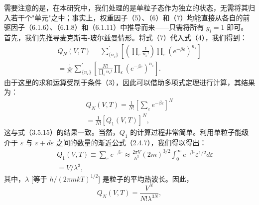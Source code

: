 需要注意的是，在本研究中，我们处理的是单粒子态作为独立的状态，无需将其归入若干个"单元"之中；事实上，权重因子（5）、（6）和（7）均能直接从各自的前驱因子（6.1.6）、（6.1.8）和（6.1.11）中推导而来——只需将所有 \(g_i = 1\) 即可。
首先，我们先推导麦克斯韦-玻尔兹曼情形。将式（7）代入式（4），我们得到：
\begin{equation}\tag{6.2.8}\label{eq:6.2.8}
\begin{array}{r} { Q _ { N } ( V , T ) = \sum _ { \{ n _ { \varepsilon } \} } ^{\prime} \left[ \left( \prod _ { \varepsilon } \frac { 1 } { n _ { \varepsilon } ! } \right) \prod _ { \varepsilon } \left( e ^{- \beta \varepsilon} \right) ^{n _ { \varepsilon} } \right] } \\{ = \frac { 1 } { N ! } \sum _ { \{ n _ { \varepsilon } \} } ^{\prime} \left[ \frac { N ! } { \prod _ { \varepsilon } n _ { \varepsilon } ! } \prod _ { \varepsilon } \left( e ^{- \beta \varepsilon} \right) ^{n _ { \varepsilon} } \right] . } \end{array}
\end{equation}
由于这里的求和运算受制于条件（3），因此可以借助多项式定理进行计算，其结果为：
\begin{equation}\tag{6.2.9}\label{eq:6.2.9}
\begin{array}{r} { Q _ { N } ( V , T ) = \frac { 1 } { N ! } \left[ \sum _ { \varepsilon } e ^{- \beta \varepsilon} \right] ^{N} } \\{ = \frac { 1 } { N ! } [ Q _ { 1 } ( V , T ) ] ^{N} , } \end{array}
\end{equation}
这与式（3.5.15）的结果一致。当然，\(Q_{1}\) 的计算过程非常简单。利用单粒子能级介于 \(\varepsilon\) 与 \(\varepsilon + d\varepsilon\) 之间的数量的渐近公式（2.4.7），我们得以得出：
\begin{equation}\tag{6.2.10}\label{eq:6.2.10}
\begin{array}{rlr} & { } & { Q _ { 1 } ( V , T ) \equiv \sum _ { \varepsilon } e ^{- \beta \varepsilon} \approx \frac { 2 \pi V } { \hbar ^{3} } ( 2 m ) ^{3 / 2} \int _ { 0 } ^{\infty} e ^{- \beta \varepsilon} \varepsilon ^{1 / 2} d \varepsilon } \\& { } & { = V / \lambda ^{3} , } \end{array}
\end{equation}
其中，\(\lambda\) {[}等于 \(h/(2\pi mkT)^{1/2}\){]} 是粒子的平均热波长。因此，
\begin{equation}\tag{6.2.11}\label{eq:6.2.11}
Q _ { N } ( V , T ) = \frac { V ^{N} } { N ! \lambda ^{3 N} } ,
\end{equation}
